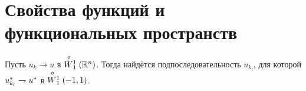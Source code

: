 \section{Свойства функций и функциональных пространств}

\begin{prop}
\label{prop:rearr_weak_conv}
Пусть $u_k \to u$ в $\stackrel{o\ }{W{}_1^1}(\mathbb R^n)$.
Тогда найдётся подпоследовательность $u_{k_l}$, для которой ${u_{k_l}^*} \rightharpoondown {u^*}$ в $\stackrel{o\ }{W{}_1^1}(-1, 1)$.
\end{prop}